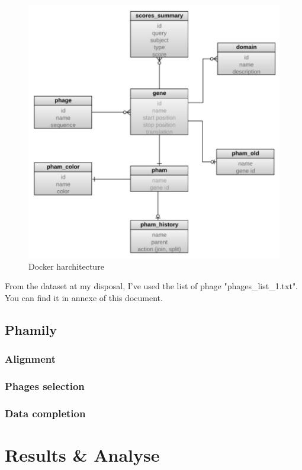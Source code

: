 \documentclass[a4paper,11pt]{report}
\begin{document}
\begin{figure}[H] 
	\begin{center}
		\includegraphics[scale=0.6]{img/12859_2011_Article_4954_Fig1_HTML}
		\caption{Docker harchitecture}
	\end{center}
\end{figure}

From the dataset at my disposal, I've used the list of phage "phages\_list\_1.txt". You can find it in annexe of this document.

\section{Phamily}
\subsection{Alignment}
\subsection{Phages selection}
\subsection{Data completion}


\chapter{Results \& Analyse}
\end{document}
